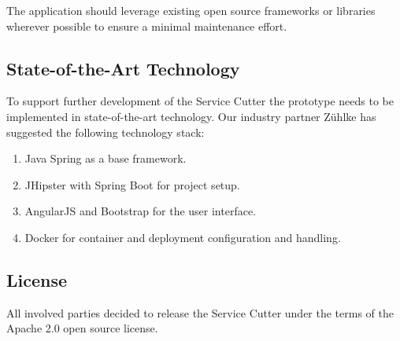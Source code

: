 The application should leverage existing open source frameworks or libraries wherever possible to ensure a minimal maintenance effort.

\subsection{State-of-the-Art Technology}

To support further development of the Service Cutter the prototype needs to be implemented in state-of-the-art technology. Our industry partner Z\"uhlke has suggested the following technology stack:

\begin{enumerate}
	\item Java Spring as a base framework. 
	\item JHipster with Spring Boot for project setup.
	\item AngularJS and Bootstrap for the user interface.
	\item Docker for container and deployment configuration and handling. 
\end{enumerate}

\subsection{License}

All involved parties decided to release the Service Cutter under the terms of the Apache 2.0 open source license.